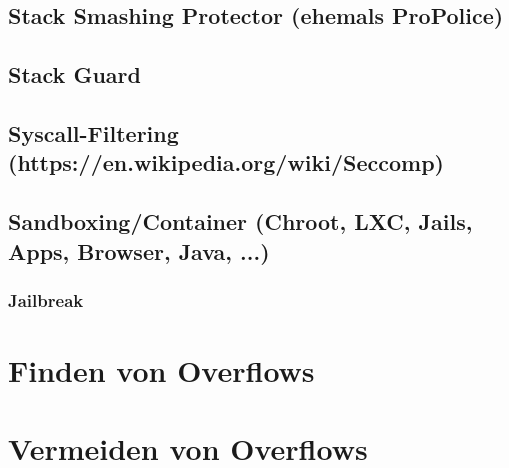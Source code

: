\documentclass[12pt]{book}
\begin{document}
\section{Stack Smashing Protector (ehemals ProPolice)}

\section{Stack Guard}

\section{Syscall-Filtering (https://en.wikipedia.org/wiki/Seccomp)}

\section{Sandboxing/Container (Chroot, LXC, Jails, Apps, Browser, Java, ...)}

\subsection{Jailbreak}

\chapter{Finden von Overflows}

\chapter{Vermeiden von Overflows}
\end{document}

